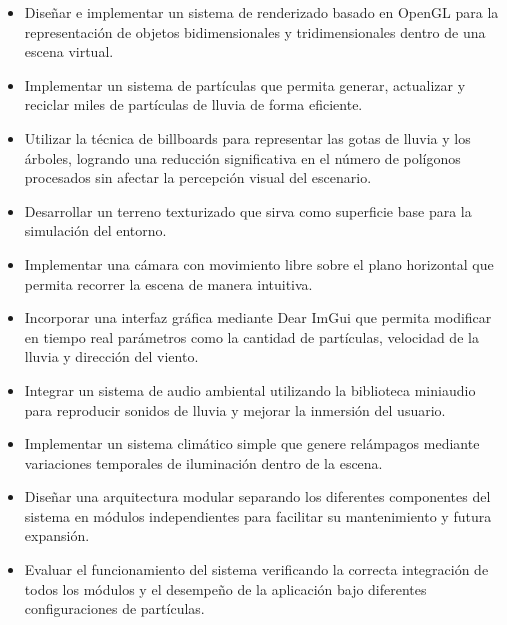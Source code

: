 \begin{itemize}

\item Diseñar e implementar un sistema de renderizado basado en OpenGL para la representación de objetos bidimensionales y tridimensionales dentro de una escena virtual.

\item Implementar un sistema de partículas que permita generar, actualizar y reciclar miles de partículas de lluvia de forma eficiente.

\item Utilizar la técnica de billboards para representar las gotas de lluvia y los árboles, logrando una reducción significativa en el número de polígonos procesados sin afectar la percepción visual del escenario.

\item Desarrollar un terreno texturizado que sirva como superficie base para la simulación del entorno.

\item Implementar una cámara con movimiento libre sobre el plano horizontal que permita recorrer la escena de manera intuitiva.

\item Incorporar una interfaz gráfica mediante Dear ImGui que permita modificar en tiempo real parámetros como la cantidad de partículas, velocidad de la lluvia y dirección del viento.

\item Integrar un sistema de audio ambiental utilizando la biblioteca miniaudio para reproducir sonidos de lluvia y mejorar la inmersión del usuario.

\item Implementar un sistema climático simple que genere relámpagos mediante variaciones temporales de iluminación dentro de la escena.

\item Diseñar una arquitectura modular separando los diferentes componentes del sistema en módulos independientes para facilitar su mantenimiento y futura expansión.

\item Evaluar el funcionamiento del sistema verificando la correcta integración de todos los módulos y el desempeño de la aplicación bajo diferentes configuraciones de partículas.

\end{itemize}